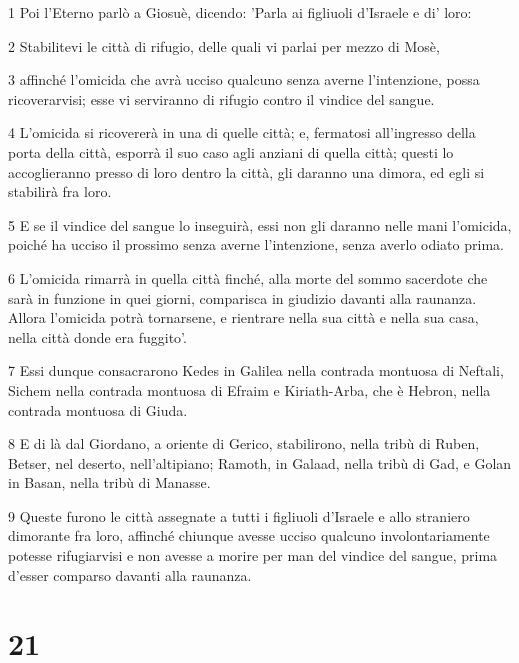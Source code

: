 \par 1 Poi l'Eterno parlò a Giosuè, dicendo: 'Parla ai figliuoli d'Israele e di' loro:
\par 2 Stabilitevi le città di rifugio, delle quali vi parlai per mezzo di Mosè,
\par 3 affinché l'omicida che avrà ucciso qualcuno senza averne l'intenzione, possa ricoverarvisi; esse vi serviranno di rifugio contro il vindice del sangue.
\par 4 L'omicida si ricovererà in una di quelle città; e, fermatosi all'ingresso della porta della città, esporrà il suo caso agli anziani di quella città; questi lo accoglieranno presso di loro dentro la città, gli daranno una dimora, ed egli si stabilirà fra loro.
\par 5 E se il vindice del sangue lo inseguirà, essi non gli daranno nelle mani l'omicida, poiché ha ucciso il prossimo senza averne l'intenzione, senza averlo odiato prima.
\par 6 L'omicida rimarrà in quella città finché, alla morte del sommo sacerdote che sarà in funzione in quei giorni, comparisca in giudizio davanti alla raunanza. Allora l'omicida potrà tornarsene, e rientrare nella sua città e nella sua casa, nella città donde era fuggito'.
\par 7 Essi dunque consacrarono Kedes in Galilea nella contrada montuosa di Neftali, Sichem nella contrada montuosa di Efraim e Kiriath-Arba, che è Hebron, nella contrada montuosa di Giuda.
\par 8 E di là dal Giordano, a oriente di Gerico, stabilirono, nella tribù di Ruben, Betser, nel deserto, nell'altipiano; Ramoth, in Galaad, nella tribù di Gad, e Golan in Basan, nella tribù di Manasse.
\par 9 Queste furono le città assegnate a tutti i figliuoli d'Israele e allo straniero dimorante fra loro, affinché chiunque avesse ucciso qualcuno involontariamente potesse rifugiarvisi e non avesse a morire per man del vindice del sangue, prima d'esser comparso davanti alla raunanza.

\chapter{21}

